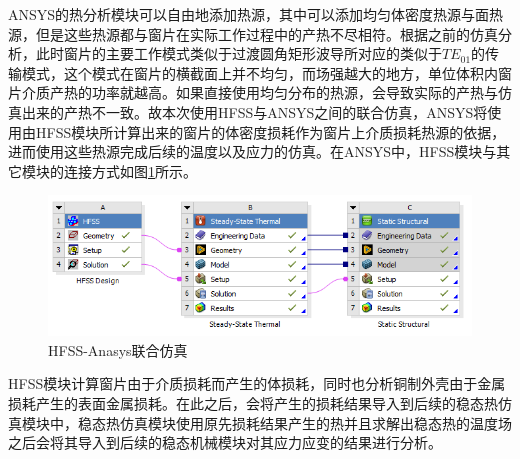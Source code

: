 \documentclass[master]{thesis-uestc}
\begin{document}
ANSYS的热分析模块可以自由地添加热源，其中可以添加均匀体密度热源与面热源，但是这些热源都与窗片在实际工作过程中的产热不尽相符。根据之前的仿真分析，此时窗片的主要工作模式类似于过渡圆角矩形波导所对应的类似于\(TE_{01}\)的传输模式，这个模式在窗片的横截面上并不均匀，而场强越大的地方，单位体积内窗片介质产热的功率就越高。如果直接使用均匀分布的热源，会导致实际的产热与仿真出来的产热不一致。故本次使用HFSS与ANSYS之间的联合仿真，ANSYS将使用由HFSS模块所计算出来的窗片的体密度损耗作为窗片上介质损耗热源的依据，进而使用这些热源完成后续的温度以及应力的仿真。在ANSYS中，HFSS模块与其它模块的连接方式如图\ref{fig:ANSYSHFSS连接}所示。
\begin{figure}[!htb]
    \centering
    \includegraphics[width=0.5\linewidth]{pic/chapter3/HFSS-ANSYS模块组织.png}
    \caption{HFSS-Anasys联合仿真}
    \label{fig:ANSYSHFSS连接}
\end{figure}
HFSS模块计算窗片由于介质损耗而产生的体损耗，同时也分析铜制外壳由于金属损耗产生的表面金属损耗。在此之后，会将产生的损耗结果导入到后续的稳态热仿真模块中，稳态热仿真模块使用原先损耗结果产生的热并且求解出稳态热的温度场之后会将其导入到后续的稳态机械模块对其应力应变的结果进行分析。
\end{document}
